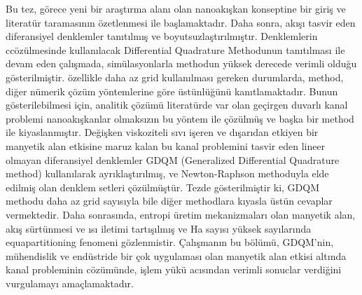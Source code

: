 Bu tez, g\"{o}rece yeni bir ara\c{s}t{\i}rma alan{\i} olan nanoak{\i}\c{s}kan konseptine bir giri\c{s} ve literat\"{u}r taramas{\i}n{\i}n \"{o}zetlenmesi ile ba\c{s}lamaktad{\i}r. Daha sonra, ak{\i}\c{s}{\i} tasvir eden diferansiyel denklemler tan{\i}t{\i}lm{\i}\c{s} ve boyutsuzla\c{s}t{\i}r{\i}lm{\i}\c{s}t{\i}r. Denklemlerin c{c}\"{o}z\"{u}lmesinde kullan{\i}lacak Differential Quadrature Methodunun tan{\i}t{\i}lmas{\i} ile devam eden \c{c}al{\i}\c{s}mada, sim\"{u}lasyonlarla methodun y\"{u}ksek derecede verimli oldu\u{g}u g\"{o}sterilmi\c{s}tir. \"{o}zellikle daha az grid kullan{\i}lmas{\i} gereken durumlarda, method, di\u{g}er n\"{u}merik \c{c}\"{o}z\"{u}m y\"{o}ntemlerine g\"{o}re \"{u}st\"{u}nl\"{u}\u{g}\"{u}n\"{u} kan{\i}tlamaktad{\i}r. Bunun g\"{o}sterilebilmesi i\c{c}in, analitik \c{c}\"{o}z\"{u}m\"{u} literat\"{u}rde var olan ge\c{c}irgen duvarl{\i} kanal problemi nanoak{\i}\c{s}kanlar olmaks{\i}z{\i}n bu y\"{o}ntem ile \c{c}\"{o}z\"{u}lm\"{u}\c{s} ve ba\c{s}ka bir method ile kiyaslanm{\i}\c{s}t{\i}r. De\u{g}i\c{s}ken viskoziteli s{\i}v{\i} i\c{s}eren ve d{\i}\c{s}ar{\i}dan etkiyen bir manyetik alan etkisine maruz kalan bu kanal problemini tasvir eden lineer olmayan diferansiyel denklemler GDQM (Generalized Differential Quadrature method) kullan{\i}larak ayr{\i}kla\c{s}t{\i}r{\i}lm{\i}\c{s}, ve Newton-Raphson methoduyla elde edilmi\c{s} olan denklem setleri \c{c}\"{o}z\"{u}lm\"{u}\c{s}t\"{u}r. Tezde g\"{o}sterilmi\c{s}tir ki, GDQM methodu daha az grid say{\i}s{\i}yla bile di\u{g}er methodlara k{\i}yasla \"{u}st\"{u}n cevaplar vermektedir. Daha sonras{\i}nda, entropi \"{u}retim mekanizmalar{\i} olan manyetik alan, ak{\i}\c{s} s\"{u}rt\"{u}nmesi ve {\i}s{\i} iletimi tart{\i}\c{s}{\i}lm{\i}\c{s} ve Ha say{\i}s{\i} y\"{u}ksek say{\i}lar{\i}nda equapartitioning fenomeni g\"{o}zlenmistir. \c{C}al{\i}\c{s}man{\i}n bu b\"{o}l\"{u}m\"{u}, GDQM'nin, m\"{u}hendislik ve end\"{u}stride bir \c{c}ok uygulamas{\i} olan manyetik alan etkisi alt{\i}nda kanal probleminin c\"{o}z\"{u}m\"{u}nde, i\c{s}lem y\"{u}k\"{u} ac{\i}s{\i}ndan verimli sonuclar verdi\u{g}ini vurgulamay{\i} ama\c{c}lamaktad{\i}r.

